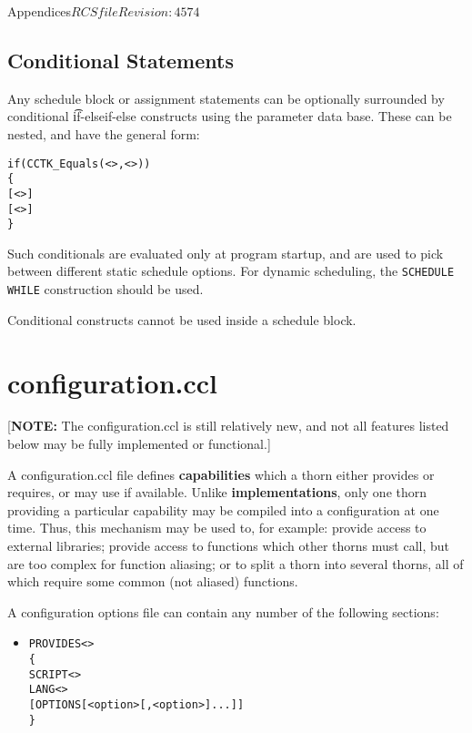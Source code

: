 \begin{cactuspart}{Appendices}{$RCSfile$}{$Revision: 4574 $}
\subsection{Conditional Statements}

Any schedule block or assignment statements can be optionally
surrounded by conditional {\t if-elseif-else}
constructs using the parameter data base. These can be nested,
and have the general form:

\begin{alltt}
if (CCTK_Equals(<>,<>))
\{
  [<>]
  [<>]
\}\end{alltt}

Such conditionals are evaluated only at program startup, and are used
to pick between different static schedule options.  For dynamic
scheduling, the {\tt SCHEDULE WHILE} construction should be used.

Conditional constructs cannot be used inside a schedule block.


\section{configuration.ccl}
\label{sec:Appendix.configuration.ccl}

[{\bf NOTE:} The configuration.ccl is still relatively new, and not
all features listed below may be fully implemented or functional.]

A configuration.ccl file defines {\bf capabilities} which a thorn
either provides or requires, or may use if available.  Unlike {\bf
implementations}, only one thorn providing a particular capability may
be compiled into a configuration at one time.  Thus, this mechanism may
be used to, for example: provide access to external libraries; provide
access to functions which other thorns must call, but are too complex
for function aliasing; or to split a thorn into several thorns, all of
which require some common (not aliased) functions.

A configuration options file can contain any number of the following
sections:

\begin{itemize}

\item

\begin{alltt}
PROVIDES <>
\{
  SCRIPT <>
  LANG <>
  [OPTIONS [<option>[,<option>]...]]
\}
\end{alltt}


\end{itemize}
\end{cactuspart}

